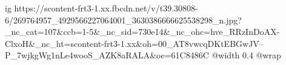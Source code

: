  
 
 
 
 

\ifcmt
  ig https://scontent-frt3-1.xx.fbcdn.net/v/t39.30808-6/269764957_4929566227064001_3630386666625538298_n.jpg?_nc_cat=107&ccb=1-5&_nc_sid=730e14&_nc_ohc=hve_RRzInDoAX-ClxoH&_nc_ht=scontent-frt3-1.xx&oh=00_AT8vwcqDKtEBGwJV--P_7wjkgWg1nLe4wooS_AZK8aRALA&oe=61C8486C
  @width 0.4
  @wrap 
\fi
